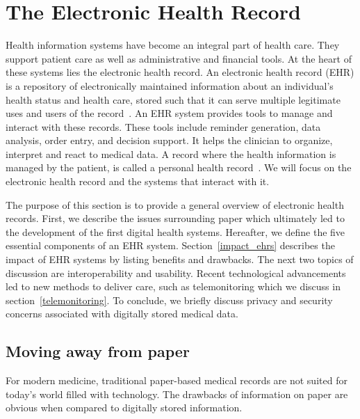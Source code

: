\section{The Electronic Health Record}\label{background}

Health information systems have become an integral part of health care. They support patient care as well as administrative and financial tools. At the heart of these systems lies the electronic health record. An electronic health record (EHR) is a repository of electronically maintained information about an individual's health status and health care, stored such that it can serve multiple legitimate uses and users of the record~\cite{Shortliffe2014}. An EHR system provides tools to manage and interact with these records. These tools include reminder generation, data analysis, order entry, and decision support. It helps the clinician to organize, interpret and react to medical data. A record where the health information is managed by the patient, is called a personal health record~\cite{Tang2006}. We will focus on the electronic health record and the systems that interact with it.

The purpose of this section is to provide a general overview of electronic health records. First, we describe the issues surrounding paper which ultimately led to the development of the first digital health systems. Hereafter, we define the five essential components of an EHR system. Section~\ref{impact_ehrs} describes the impact of EHR systems by listing benefits and drawbacks. The next two topics of discussion are interoperability and usability. Recent technological advancements led to new methods to deliver care, such as telemonitoring which we discuss in section~\ref{telemonitoring}. To conclude, we briefly discuss privacy and security concerns associated with digitally stored medical data.

    \subsection{Moving away from paper}\label{paper}

    For modern medicine, traditional paper-based medical records are not suited for today's world filled with technology. The drawbacks of information on paper are obvious when compared to digitally stored information.

